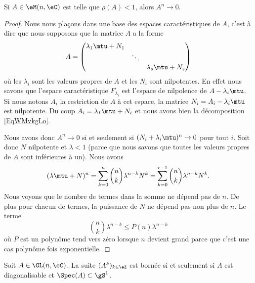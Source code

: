 \begin{proposition}
    Si \( A\in \eM(n,\eC)\) est telle que \( \rho(A)<1\), alors \( A^n\to 0\).
\end{proposition}

\begin{proof}
    Nous nous plaçons dans une base des espaces caractéristiques de \( A\), c'est à dire que nous supposons que la matrice \( A\) a la forme
    \begin{equation}        \label{EqWMvkgLo}
        A=\begin{pmatrix}
            \lambda_1\mtu+N_1    &       &       \\
                &   \ddots    &       \\
                &       &   \lambda_s\mtu+N_s
        \end{pmatrix}
    \end{equation}
    où les \( \lambda_i\) sont les valeurs propres de \( A\) et les \( N_i\) sont nilpotentes. En effet nous savons que l'espace caractéristique \( F_{\lambda_i}\) est l'espace de nilpolence de \( A-\lambda_i\mtu\). Si nous notons \( A_i\) la restriction de \( A\) à cet espace, la matrice \( N_i=A_i-\lambda_i\mtu\) est nilpotente. Du coup \( A_i=\lambda_I\mtu+N_i\) et nous avons bien la décomposition \eqref{EqWMvkgLo}.

    Nous avons donc \( A^n\to 0\) si et seulement si \( (N_i+\lambda_i\mtu)^n\to 0\) pour tout \( i\). Soit donc \( N\) nilpotente et \( \lambda<1\) (parce que nous savons que toutes les valeurs propres de \( A\) sont inférieures à un). Nous avons
    \begin{equation}
            (\lambda\mtu+N)^n=\sum_{k=0}^n\binom{ n }{ k }\lambda^{n-k}N^{k}
            =\sum_{k=0}^{r-1}\binom{ n }{ k }\lambda^{n-k}N^{k}.
    \end{equation}
    Nous voyons que le nombre de termes dans la somme ne dépend pas de \( n\). De plus pour chacun de termes, la puissance de \( N\) ne dépend pas non plus de \( n\). Le terme
    \begin{equation}
        \binom{ n }{ k }\lambda^{n-k}\leq P(n)\lambda^{n-k}
    \end{equation}
    où \( P\) est un polynôme tend vers zéro lorsque \( n\) devient grand parce que c'est une cas polynôme fois exponentielle.
\end{proof}

\begin{proposition}
    Soit \( A\in\GL(n,\eC)\). La suite \( (A^k)_{k\in \eZ}\) est bornée si et seulement si \( A\) est diagonalisable et \( \Spec(A)\subset \gS^1\).
\end{proposition}


